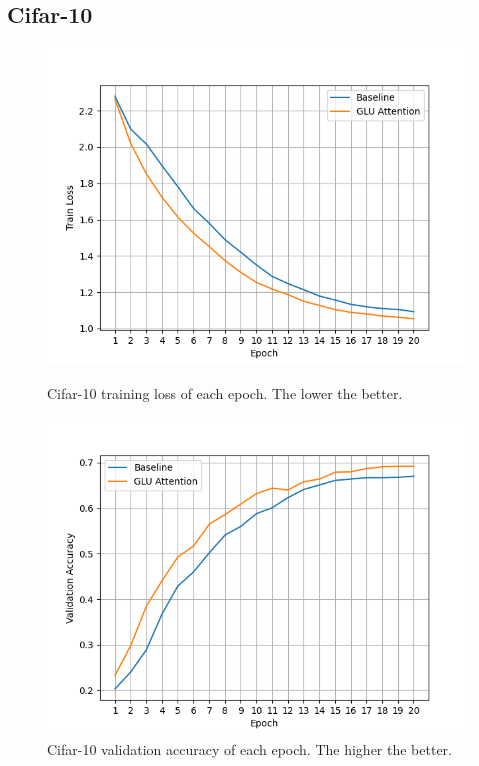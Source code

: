 \documentclass[11pt]{article}
\begin{document}
\subsection{Cifar-10}

\begin{figure}[htbp]
    \centering
    \begin{minipage}{0.49\textwidth}
        \centering
        \includegraphics[width=\textwidth]{cifar10_train_loss.png}
        \caption{Cifar-10 training loss of each epoch. The lower the better.}
        \label{fig:cifar10_train_loss}
    \end{minipage}
    \hfill
    \begin{minipage}{0.49\textwidth}
        \centering
        \includegraphics[width=\textwidth]{cifar10_val_acc.png}
        \caption{Cifar-10 validation accuracy of each epoch. The higher the better.}
        \label{fig:cifar10_val_acc}
    \end{minipage}
\end{figure}
\end{document}
